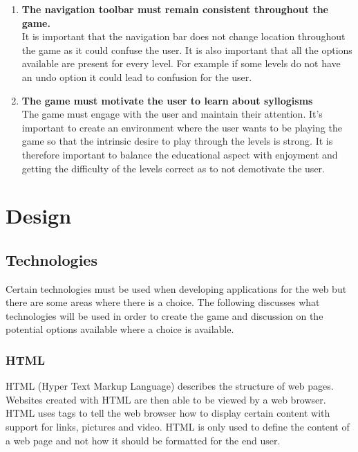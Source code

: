 \documentclass[12pt,a4paper]{report}
\begin{document}
\begin{enumerate}[label*=\arabic*]
                                      \item \textbf{The navigation toolbar must remain consistent throughout the game.
                                      }\\
It is important that the navigation bar does not change location throughout the game as it could confuse the user. It is also important that all the options available are present for every level. For example if some levels do not have an undo option it could lead to confusion for the user.

                                      \item \textbf{The game must motivate the user to learn about syllogisms
}\\
The game must engage with the user and maintain their attention. It's important to create an environment where the user wants to be playing the game so that the intrinsic desire to play through the levels is strong. It is therefore important to balance the educational aspect with enjoyment and getting the difficulty of the levels correct as to not demotivate the user.
            \end{enumerate}
            
\chapter{Design}

\section{Technologies}

Certain technologies must be used when developing applications for the web but there are some areas where there is a choice. The following discusses what technologies will be used in order to create the game and discussion on the potential options available where a choice is available. 

\subsection{HTML}
HTML (Hyper Text Markup Language) describes the structure of web pages. Websites created with HTML are then able to be viewed by a web browser. HTML uses tags to tell the web browser how to display certain content with support for links, pictures and video. HTML is only used to define the content of a web page and not how it should be formatted for the end user.
\end{document}
